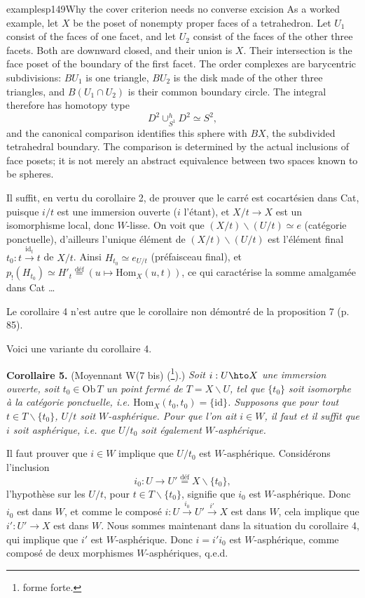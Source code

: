 \begin{dcomment}{examples}{p149}{Why the cover criterion needs no converse excision}
As a worked example, let $X$ be the poset of nonempty proper faces of a tetrahedron. Let $U_1$ consist of the faces of one facet, and let $U_2$ consist of the faces of the other three facets. Both are downward closed, and their union is $X$. Their intersection is the face poset of the boundary of the first facet. The order complexes are barycentric subdivisions: $BU_1$ is one triangle, $BU_2$ is the disk made of the other three triangles, and $B(U_1\cap U_2)$ is their common boundary circle. The integral therefore has homotopy type
\[
 D^2\mathop{\cup}^{h}_{S^1}D^2\simeq S^2,
\]
and the canonical comparison identifies this sphere with $BX$, the subdivided tetrahedral boundary. The comparison is determined by the actual inclusions of face posets; it is not merely an abstract equivalence between two spaces known to be spheres.
\end{dcomment}


Il suffit, en vertu du corollaire 2, de prouver que le carré est cocartésien dans Cat, puisque $i/t$ est une immersion ouverte ($i$ l'étant), et $X/t\longrightarrow X$ est un isomorphisme local, donc $W$-lisse. On voit que $(X/t)\backslash(U/t)\simeq e$ (catégorie ponctuelle), d'ailleurs l'unique élément de $(X/t)\backslash(U/t)$ est l'élément final $t_0 : t\xrightarrow{\mathrm{id}_t} t$ de $X/t$. Ainsi $H_{t_0}\simeq e_{U/t}$ (préfaisceau final), et $p_{!}(H_{t_0})\simeq H'_t \overset{\text{déf}}{=} (u\longmapsto \mathrm{Hom}_X(u,t))$, ce qui caractérise la somme amalgamée dans Cat
\dots

Le corollaire 4 n'est autre que le corollaire non démontré de la proposition 7 (p. 85).

Voici une variante du corollaire 4.

\noindent\textbf{Corollaire 5.} (Moyennant W(7 bis) (\footnote[105]{forme forte.}).) \textit{Soit $i : U \hto X$ une immersion ouverte, soit $t_0\in\mathrm{Ob}\,T$ un point \textup{fermé} de $T=X\backslash U$, tel que $\{t_0\}$}
\textit{soit isomorphe à la catégorie ponctuelle, i.e. $\mathrm{Hom}_X(t_0,t_0)=\{\mathrm{id}\}$. Supposons que pour tout $t\in T\backslash\{t_0\}$, $U/t$ soit $W$-asphérique. Pour que l'on ait $i\in W$, il faut et il suffit que $i$ soit asphérique, i.e. que $U/t_0$ soit également $W$-asphérique.}

Il faut prouver que $i\in W$ implique que $U/t_0$ est $W$-asphérique. Considérons l'inclusion
\[
i_0 : U\longrightarrow U' \overset{\text{déf}}{=} X\backslash\{t_0\},
\]
l'hypothèse sur les $U/t$, pour $t\in T\backslash\{t_0\}$, signifie que $i_0$ est $W$-asphérique. Donc $i_0$ est dans $W$, et comme le composé $i : U\xrightarrow{i_0} U'\xrightarrow{i'} X$ est dans $W$, cela implique que
$i' : U'\longrightarrow X$ est dans $W$. Nous sommes maintenant dans la situation du corollaire 4, qui implique que $i'$ est $W$-asphérique. Donc $i=i'i_0$ est $W$-asphérique, comme composé de deux morphismes $W$-asphériques, q.e.d.


